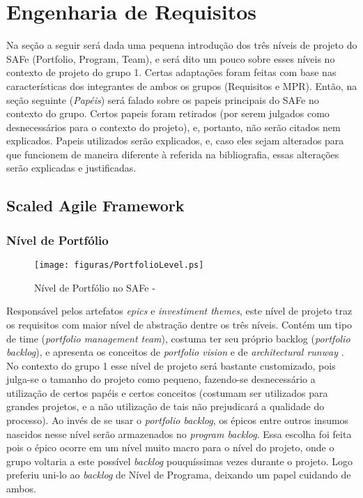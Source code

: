 \chapter[Engenharia de Requisitos]{Engenharia de Requisitos}
Na seção a seguir será dada uma pequena introdução dos três níveis de projeto do SAFe (Portfolio, Program, Team), e será dito um pouco sobre esses níveis no contexto de projeto do grupo 1. Certas adaptações foram feitas com base nas características dos integrantes de ambos os grupos (Requisitos e MPR). Então, na seção seguinte (\emph{Papéis}) será falado sobre os papeis principais do SAFe no contexto do grupo. Certos papeis foram retirados (por serem julgados como desnecessários para o contexto do projeto), e, portanto, não serão citados nem explicados. Papeis utilizados serão explicados, e, caso eles sejam alterados para que funcionem de maneira diferente à referida na bibliografia, essas alterações serão explicadas e justificadas.

\section{Scaled Agile Framework}
\subsection{Nível de Portfólio}
\begin{figure}[h]
  \centering
  \caption{Nível de Portfólio no SAFe - \cite[p. 44]{safe001}}
  \texttt{[image: figuras/PortfolioLevel.ps]}
\end{figure}

Responsável pelos artefatos \emph{epics} e \emph{investiment themes}, este nível de projeto traz os requisitos com maior nível de abstração dentre os três níveis. Contém um tipo de time (\emph{portfolio management team}), costuma ter seu próprio backlog (\emph{portfolio backlog}), e apresenta os conceitos de \emph{portfolio vision} e de \emph{architectural runway} \cite[p. 227-228]{safe001}. No contexto do grupo 1 esse nível de projeto será bastante customizado, pois julga-se o tamanho do projeto como pequeno, fazendo-se desnecessário a utilização de certos papéis e certos conceitos (costumam ser utilizados para grandes projetos, e a não utilização de tais não prejudicará a qualidade do processo). Ao invés de se usar o \emph{portfolio backlog}, os épicos entre outros insumos nascidos nesse nível serão armazenados no \emph{program backlog}. Essa escolha foi feita pois o épico ocorre em um nível muito macro para o nível do projeto, onde o grupo voltaria a este possível \emph{backlog} pouquíssimas vezes durante o projeto. Logo preferiu uni-lo ao \emph{backlog} de Nível de Programa, deixando um papel cuidando de ambos.

